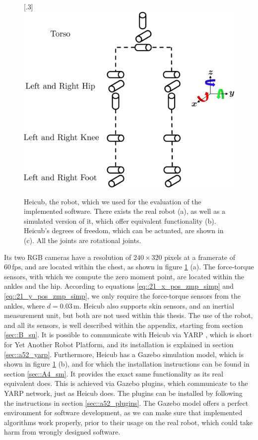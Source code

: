 \begin{figure}[h!]
	[.3\linewidth]{\includegraphics[scale=.35]{chapters/05_heicub_our_humanoid_robot/img/kinematic_tree.png}}
	\caption{Heicub, the robot, which we used for the evaluation of the implemented software. There exists the real robot (a), as well as a simulated version of it, which offer equivalent functionality (b). Heicub's degrees of freedom, which can be actuated, are shown in (c). All the joints are rotational joints.}
	\label{fig::5_hei}
\end{figure}
Its two RGB cameras have a resolution of $240\times320$ pixels at a framerate of $60\,\text{fps}$, and are located within the chest, as shown in figure \ref{fig::5_hei} (a). The force-torque sensors, with which we compute the zero moment point, are located within the ankles and the hip. According to equations \ref{eq::21_x_pos_zmp_simp} and \ref{eq::21_y_pos_zmp_simp}, we only require the force-torque sensors from the ankles, where $d=0.03\,\text{m}$. Heicub also supports skin sensors, and an inertial measurement unit, but both are not used within this thesis. The use of the robot, and all its sensors, is well described within the appendix, starting from section \ref{sec::B_su}. It is possible to communicate with Heicub via YARP \cite{metta2006yarp}, which is short for Yet Another Robot Platform, and its installation is explained in section \ref{sec::a52_yarp}. Furthermore, Heicub has a Gazebo \cite{koenig2004design} simulation model, which is shown in figure \ref{fig::5_hei} (b), and for which the installation instructions can be found in section \ref{sec::A4_sm}. It provides the exact same functionality as its real equivalent does. This is achieved via Gazebo plugins, which communicate to the YARP network, just as Heicub does. The plugins can be installed by following the instructions in section \ref{sec::a52_plugins}. The Gazebo model offers a perfect environment for software development, as we can make sure that implemented algorithms work properly, prior to their usage on the real robot, which could take harm from wrongly designed software.